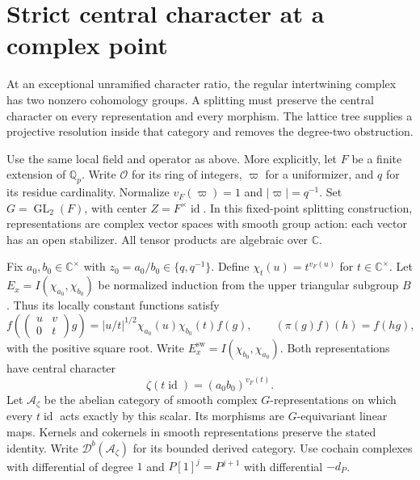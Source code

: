 \section{Strict central character at a complex point}

At an exceptional unramified character ratio, the regular intertwining complex has two nonzero cohomology groups.
A splitting must preserve the central character on every representation and every morphism.
The lattice tree supplies a projective resolution inside that category and removes the degree-two obstruction.

Use the same local field and operator as above. More explicitly, let $F$ be a finite extension of $\mathbb Q_p$.
Write $\mathcal O$ for its ring of integers, $\varpi$ for a uniformizer,
and $q$ for its residue cardinality.
Normalize $v_F(\varpi)=1$ and $|\varpi|=q^{-1}$.
Set $G=\operatorname{GL}_2(F)$, with center $Z=F^\times\operatorname{id}$.
In this fixed-point splitting construction, representations are complex vector spaces with smooth group action:
each vector has an open stabilizer.
All tensor products are algebraic over $\mathbb C$.

Fix $a_0,b_0\in\mathbb C^\times$ with $z_0=a_0/b_0\in\{q,q^{-1}\}$.
Define $\chi_t(u)=t^{v_F(u)}$ for $t\in\mathbb C^\times$.
Let $E_x=I(\chi_{a_0},\chi_{b_0})$ be normalized induction from the upper triangular subgroup $B$.
Thus its locally constant functions satisfy
\[
 f\left(\begin{pmatrix}u&v\\0&t\end{pmatrix}g\right)
   =|u/t|^{1/2}\chi_{a_0}(u)\chi_{b_0}(t)f(g),
 \qquad (\pi(g)f)(h)=f(hg),
\]
with the positive square root.
Write $E_x^{\mathrm{sw}}=I(\chi_{b_0},\chi_{a_0})$.
Both representations have central character
\[
 \zeta(t\operatorname{id})=(a_0b_0)^{v_F(t)}.
\]
Let $\mathcal A_\zeta$ be the abelian category of smooth complex $G$-representations
on which every $t\operatorname{id}$ acts exactly by this scalar.
Its morphisms are $G$-equivariant linear maps.
Kernels and cokernels in smooth representations preserve the stated identity.
Write $\mathcal D^b(\mathcal A_\zeta)$ for its bounded derived category.
Use cochain complexes with differential of degree $1$ and
$P[1]^j=P^{j+1}$ with differential $-d_P$.

